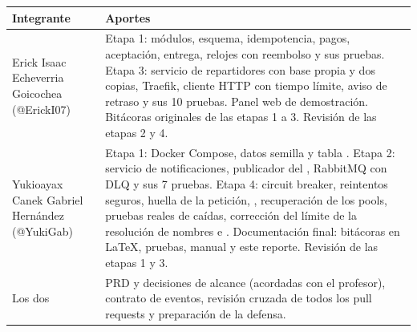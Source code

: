 \documentclass[11pt]{article}
\begin{document}
\begin{tabularx}{\linewidth}{@{}P{4.2cm} Y@{}}
\toprule
\textsf{\textbf{Integrante}} & \textsf{\textbf{Aportes}} \\
\midrule
Erick Isaac Echeverria Goicochea (@ErickI07) & Etapa 1: módulos, esquema, idempotencia, pagos, aceptación, entrega, relojes con reembolso y sus pruebas. Etapa 3: servicio de repartidores con base propia y dos copias, Traefik, cliente HTTP con tiempo límite, aviso de retraso y sus 10 pruebas. Panel web de demostración. Bitácoras originales de las etapas 1 a 3. Revisión de las etapas 2 y 4. \\
Yukioayax Canek Gabriel Hernández (@YukiGab) & Etapa 1: Docker Compose, datos semilla y tabla . Etapa 2: servicio de notificaciones, publicador del , RabbitMQ con DLQ y sus 7 pruebas. Etapa 4: circuit breaker, reintentos seguros, huella de la petición, , recuperación de los pools, pruebas reales de caídas, corrección del límite de la resolución de nombres e . Documentación final: bitácoras en \LaTeX, pruebas, manual y este reporte. Revisión de las etapas 1 y 3. \\
Los dos & PRD y decisiones de alcance (acordadas con el profesor), contrato de eventos, revisión cruzada de todos los pull requests y preparación de la defensa. \\
\bottomrule
\end{tabularx}
\end{document}
